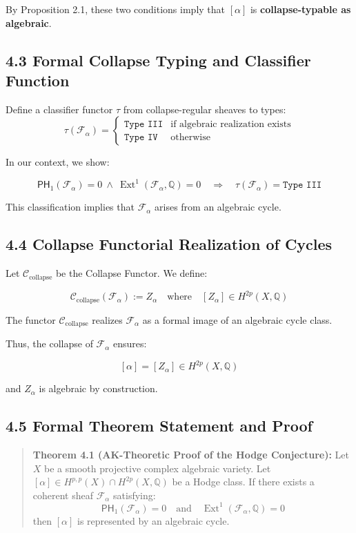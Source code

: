 \documentclass[11pt]{article}
\DeclareMathOperator{\Ext}{Ext}
\begin{document}
By Proposition 2.1, these two conditions imply that $[\alpha]$ is \textbf{collapse-typable as algebraic}.

\subsection{4.3 Formal Collapse Typing and Classifier Function}

Define a classifier functor $\tau$ from collapse-regular sheaves to types:
\[
\tau(\mathcal{F}_\alpha) =
\begin{cases}
\texttt{Type III} & \text{if algebraic realization exists} \\
\texttt{Type IV} & \text{otherwise}
\end{cases}
\]

In our context, we show:

\[
\mathsf{PH}_1(\mathcal{F}_\alpha) = 0 \ \wedge\ \Ext^1(\mathcal{F}_\alpha, \mathbb{Q}) = 0
\quad \Rightarrow \quad \tau(\mathcal{F}_\alpha) = \texttt{Type III}
\]

This classification implies that $\mathcal{F}_\alpha$ arises from an algebraic cycle.

\subsection{4.4 Collapse Functorial Realization of Cycles}

Let $\mathcal{C}_{\text{collapse}}$ be the Collapse Functor.  
We define:

\[
\mathcal{C}_{\text{collapse}}(\mathcal{F}_\alpha) := Z_\alpha
\quad \text{where} \quad [Z_\alpha] \in H^{2p}(X, \mathbb{Q})
\]

The functor $\mathcal{C}_{\text{collapse}}$ realizes $\mathcal{F}_\alpha$ as a formal image of an algebraic cycle class.

Thus, the collapse of $\mathcal{F}_\alpha$ ensures:

\[
[\alpha] = [Z_\alpha] \in H^{2p}(X, \mathbb{Q})
\]

and $Z_\alpha$ is algebraic by construction.

\subsection{4.5 Formal Theorem Statement and Proof}

\begin{quote}
\textbf{Theorem 4.1 (AK-Theoretic Proof of the Hodge Conjecture):}  
Let $X$ be a smooth projective complex algebraic variety.  
Let $[\alpha] \in H^{p,p}(X) \cap H^{2p}(X, \mathbb{Q})$ be a Hodge class.  
If there exists a coherent sheaf $\mathcal{F}_\alpha$ satisfying:
\[
\mathsf{PH}_1(\mathcal{F}_\alpha) = 0 \quad \text{and} \quad \Ext^1(\mathcal{F}_\alpha, \mathbb{Q}) = 0
\]
then $[\alpha]$ is represented by an algebraic cycle.
\end{quote}
\end{document}
